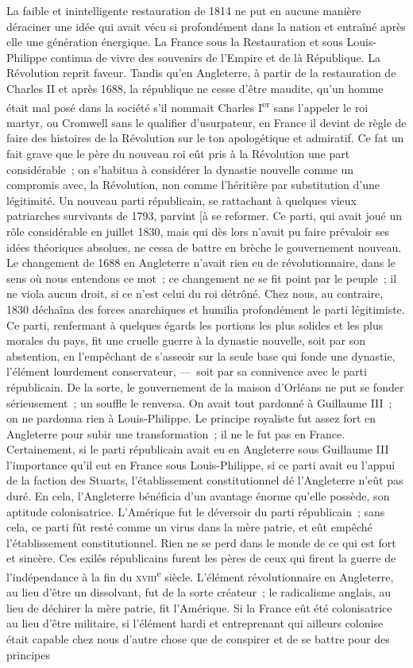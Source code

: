 \documentclass[french,twoside]{book} %
\begin{document}
La faible et inintelligente restauration de 1814 ne put en aucune manière déraciner une idée qui avait vécu si profondément dans la nation et entraîné après elle une génération énergique. La France sous la Restauration et sous Louis-Philippe continua de vivre des souvenirs de l’Empire et de là République. La Révolution reprit faveur. Tandis qu’en Angleterre, à partir de la restauration de Charles II et après 1688, la république ne cesse d’être maudite, qu’un homme était mal posé dans la société s’il nommait Charles I\textsuperscript{er} sans l’appeler le roi martyr, ou Cromwell sans le qualifier d’usurpateur, en France il devint de règle de faire des histoires de la Révolution sur le ton apologétique et admiratif. Ce fat un fait grave que le père du nouveau roi eût pris à la Révolution une part considérable ; on s’habitua à considérer la dynastie nouvelle comme un compromis avec, la Révolution, non comme l’héritière par substitution d’une légitimité. Un nouveau parti républicain, se rattachant à quelques vieux patriarches survivants de 1793, parvint [à se reformer. Ce parti, qui avait joué un rôle considérable en juillet 1830, mais qui dès lors n’avait pu faire prévaloir ses idées théoriques absolues, ne cessa de battre en brèche le gouvernement nouveau. Le changement de 1688 en Angleterre n’avait rien eu de révolutionnaire, dans le sens où nous entendons ce mot ; ce changement ne se fit point par le peuple ; il ne viola aucun droit, si ce n’est celui du roi détrôné. Chez nous, au contraire, 1830 déchaîna des forces anarchiques et humilia profondément le parti légitimiste. Ce parti, renfermant à quelques égards les portions les plus solides et les plus morales du pays, fit une cruelle guerre à la dynastie nouvelle, soit par son abstention, en l’empêchant de s’asseoir sur la seule base qui fonde une dynastie, l’élément lourdement conservateur, — soit par sa connivence avec le parti républicain. De la sorte, le gouvernement de la maison d’Orléans ne put se fonder sérieusement ; un souffle le renversa. On avait tout pardonné à Guillaume III ; on ne pardonna rien à Louis-Philippe. Le principe royaliste fut assez fort en Angleterre pour subir une transformation ; il ne le fut pas en France. Certainement, si le parti républicain avait eu en Angleterre sous Guillaume III l’importance qu’il eut en France sous Louis-Philippe, si ce parti avait eu l’appui de la faction des Stuarts, l’établissement constitutionnel dé l’Angleterre n’eût pas duré. En cela, l’Angleterre bénéficia d’un avantage énorme qu’elle possède, son aptitude colonisatrice. L’Amérique fut le déversoir du parti républicain ; sans cela, ce parti fût resté comme un virus dans la mère patrie, et eût empêché l’établissement constitutionnel. Rien ne se perd dans le monde de ce qui est fort et sincère. Ces exilés républicains furent les pères de ceux qui firent la guerre de l’indépendance à la fin du \textsc{xviii}\textsuperscript{e} siècle. L’élément révolutionnaire en Angleterre, au lieu d’être un dissolvant, fut de la sorte créateur ; le radicalisme anglais, au lieu de déchirer la mère patrie, fit l’Amérique. Si la France eût été colonisatrice au lieu d’être militaire, si l’élément hardi et entreprenant qui ailleurs colonise était capable chez nous d’autre chose que de conspirer et de se battre pour des principes 
\end{document}
